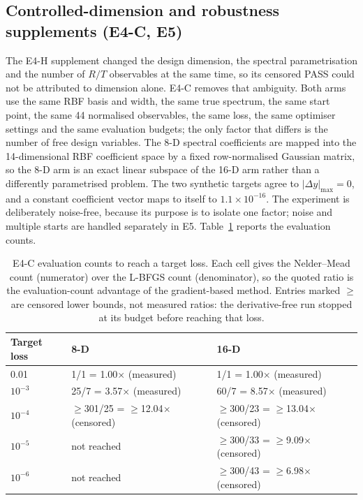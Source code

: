 \subsection{Controlled-dimension and robustness supplements (E4-C, E5)}
\label{sec:supplements}

The E4-H supplement changed the design dimension, the spectral
parametrisation and the number of $R/T$ observables at the same time, so its
censored PASS could not be attributed to dimension alone. E4-C removes that
ambiguity. Both arms use the same RBF basis and width, the same true spectrum,
the same start point, the same 44 normalised observables, the same loss, the
same optimiser settings and the same evaluation budgets; the only factor that
differs is the number of free design variables. The 8-D spectral coefficients
are mapped into the 14-dimensional RBF coefficient space by a fixed
row-normalised Gaussian matrix, so the 8-D arm is an exact linear subspace of
the 16-D arm rather than a differently parametrised problem. The two synthetic
targets agree to $|\Delta y|_{\max} = 0$,
and a constant coefficient vector maps to itself to $1.1\times10^{-16}$.
The experiment is deliberately noise-free, because its purpose is to isolate
one factor; noise and multiple starts are handled separately in E5.
Table~\ref{tab:e4c} reports the evaluation counts.

\begin{table}[t]
\centering
\footnotesize
\caption{E4-C evaluation counts to reach a target loss. Each cell gives the
Nelder--Mead count (numerator) over the L-BFGS count (denominator), so the
quoted ratio is the evaluation-count advantage of the gradient-based method.
Entries marked $\ge$ are censored lower bounds, not measured ratios: the
derivative-free run stopped at its budget before reaching that loss.}
\label{tab:e4c}
\begin{tabular}{lp{5.0cm}p{5.0cm}}
\toprule
Target loss & 8-D & 16-D \\
\midrule
0.01 & 1/1 = 1.00$\times$ (measured) & 1/1 = 1.00$\times$ (measured) \\
$10^{-3}$ & 25/7 = 3.57$\times$ (measured) & 60/7 = 8.57$\times$ (measured) \\
$10^{-4}$ & $\ge$301/25 = $\ge$12.04$\times$ (censored) & $\ge$300/23 = $\ge$13.04$\times$ (censored) \\
$10^{-5}$ & not reached & $\ge$300/33 = $\ge$9.09$\times$ (censored) \\
$10^{-6}$ & not reached & $\ge$300/43 = $\ge$6.98$\times$ (censored) \\
\bottomrule
\end{tabular}
\end{table}

